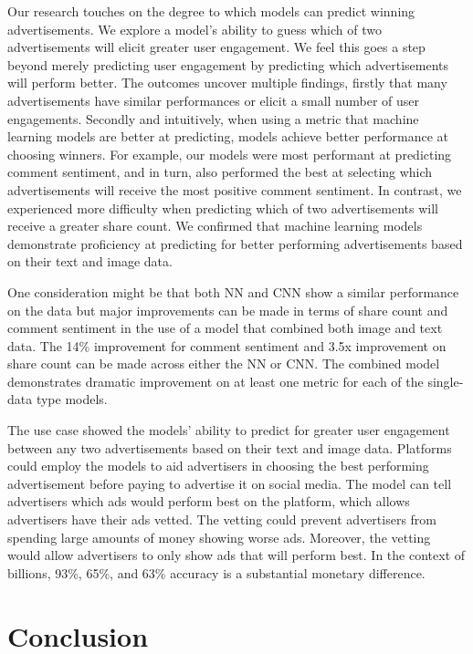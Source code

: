 \documentclass[mksc,blindrev]{informs3} %
\begin{document}
Our research touches on the degree to which models can predict winning advertisements. We explore a model's ability to guess which of two advertisements will elicit greater user engagement. We feel this goes a step beyond merely predicting user engagement by predicting which advertisements will perform better. The outcomes uncover multiple findings, firstly that many advertisements have similar performances or elicit a small number of user engagements. Secondly and intuitively, when using a metric that machine learning models are better at predicting, models achieve better performance at choosing winners. For example, our models were most performant at predicting comment sentiment, and in turn, also performed the best at selecting which advertisements will receive the most positive comment sentiment. In contrast, we experienced more difficulty when predicting which of two advertisements will receive a greater share count. We confirmed that machine learning models demonstrate proficiency at predicting for better performing advertisements based on their text and image data.


One consideration might be that both NN and CNN show a similar performance on the data but major improvements can be made in terms of share count and comment sentiment in the use of a model that combined both image and text data. The 14\% improvement for comment sentiment and 3.5x improvement on share count can be made across either the NN or CNN. The combined model demonstrates dramatic  improvement on at least one metric for each of the single-data type models.

The use case showed the models' ability to predict for greater user engagement between any two advertisements based on their text and image data. Platforms could employ the models to aid advertisers in choosing the best performing advertisement before paying to advertise it on social media. The model can tell advertisers which ads would perform best on the platform, which allows advertisers have their ads vetted. The vetting could prevent advertisers from spending large amounts of money showing worse ads. Moreover, the vetting would allow advertisers to only show ads that will perform best. In the context of billions, 93\%, 65\%, and 63\% accuracy is a substantial monetary difference.

\section{Conclusion}
\end{document}
